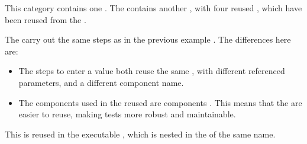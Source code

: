 
This category contains one \gdcase{}. The \gdcase{} contains another \gdcase{}, with four reused \gdcases, which have been reused from the \gdproject{} . 

The \gdcases{} carry out the same steps as in the previous example . The differences here are:\\

\begin{itemize}
\item The steps to enter a value both reuse the same \gdcase{}, with different referenced parameters, and a different component name. 
\item The components used in the reused \gdcases{} are  components . This means that the \gdcases{} are easier to reuse, making tests more robust and maintainable. 
\end{itemize}

This \gdcase{} is reused in the executable \gdcase{} , which is nested in the \gdsuite{} of the same name. 



